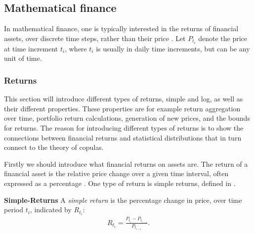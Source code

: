 

\subsection{Mathematical finance}
In mathematical finance, one is typically interested in the returns of financial assets, over discrete time steps, rather than their price \citet[p.~2]{Danielsson2011}. Let $P_{t_i}$ denote the price at time increment $t_i$, where $t_i$ is usually in daily time increments, but can be any unit of time. 


\subsubsection{Returns}
This section will introduce different types of returns, simple and log, as well as their different properties. These properties are for example return aggregation over time, portfolio return calculations, generation of new prices, and the bounds for returns. The reason for introducing different types of returns is to show the connections between financial returns and statistical distributions that in turn connect to the theory of copulas. 

Firstly we should introduce what financial returns on assets are. The return of a financial asset is the relative price change over a given time interval, often expressed as a percentage \citet[p.~2]{Danielsson2011}. One type of return is simple returns, defined in .

\begin{definition}\label{def:simpleReturns}
    \textbf{Simple-Returns} \citet[p.~3]{Danielsson2011}
    A \emph{simple return} is the percentage change in price, over time period $t_i$, indicated by $R_{t_i}$:
    \begin{align*}
        R_{t_i} = \frac{P_{t_i}-P_{t_{i-1}}}{P_{t_{i-1}}}.
    \end{align*}
\end{definition}

